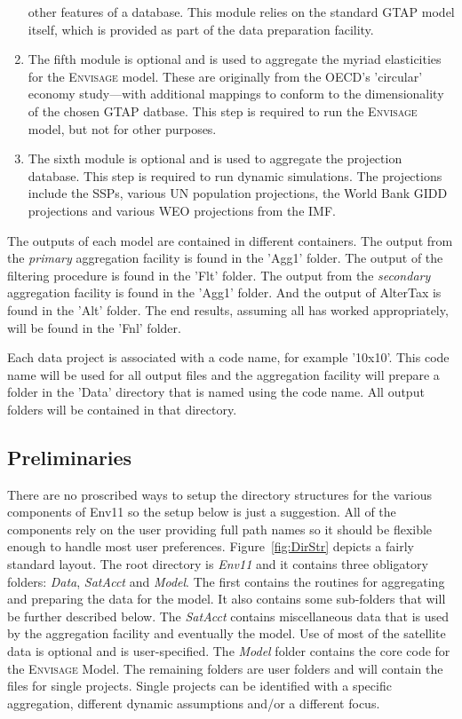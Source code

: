 \begin{enumerate}
         other features of a database. This module relies on the standard GTAP
         model itself, which is provided as part of the data preparation
         facility.
   \item The fifth module is optional and is used to aggregate the myriad
   elasticities for the \textsc{Envisage} model. These are originally from
   the OECD's 'circular' economy study---with additional mappings to conform
   to the dimensionality of the chosen GTAP datbase. This step is required to
   run the \textsc{Envisage} model, but not for other purposes.
   \item The sixth module is optional and is used to aggregate the projection
      database. This step is required to run dynamic simulations. The projections
      include the SSPs, various UN population projections, the World Bank GIDD projections
      and various WEO projections from the IMF.

\end{enumerate}

The outputs of each model are contained in different containers. The output from the
\emph{primary} aggregation facility is found in the 'Agg1' folder. The output of the filtering
procedure is found in the 'Flt' folder. The output from the
\emph{secondary} aggregation facility is found in the 'Agg1' folder. And the output of AlterTax is found in
the 'Alt' folder. The end results, assuming all has worked appropriately, will
be found in the 'Fnl' folder.

Each data project is associated with a code name, for example '10x10'. This code
name will be used for all output files and the aggregation facility will prepare
a folder in the 'Data' directory that is named using the code name. All output
folders will be contained in that directory.

\subsection{Preliminaries}

There are no proscribed ways to setup the directory structures for the various
components of Env11 so the setup below is just a suggestion. All of the
components rely on the user providing full path names so it should be flexible
enough to handle most user preferences. Figure~\ref{fig:DirStr} depicts a fairly
standard layout. The root directory is \emph{Env11} and it contains three
obligatory folders: \emph{Data}, \emph{SatAcct} and \emph{Model}. The first
contains the routines for aggregating and preparing the data for the model. It
also contains some sub-folders that will be further described below. The
\emph{SatAcct} contains miscellaneous data that is used by the aggregation
facility and eventually the model. Use of most of the satellite data is optional
and is user-specified. The \emph{Model} folder contains the core code for the
\textsc{Envisage} Model. The remaining folders are user folders and will contain
the files for single projects. Single projects can be identified with a specific
aggregation, different dynamic assumptions and/or a different focus.

